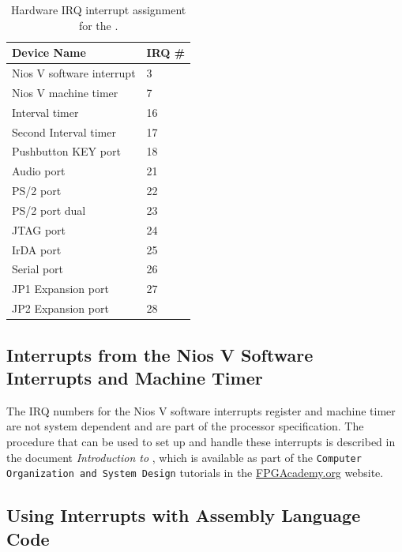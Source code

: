 \begin{table}[h]
    \begin{center}
    \begin{tabular}{l|l}
            \textbf{Device Name} &
            \textbf{IRQ \#}
        \\\hline
            Nios V software interrupt & 3 \\
            Nios V machine timer & 7 \\
            Interval timer & 16 \\
            Second Interval timer & 17 \\
            Pushbutton KEY port & 18 \\
            Audio port & 21 \\
            PS/2 port & 22 \\
            PS/2 port dual & 23 \\
            JTAG port & 24 \\
			IrDA port & 25 \\
            Serial port & 26 \\
            JP1 Expansion port & 27 \\
            JP2 Expansion port & 28 \\
    \end{tabular}
    \caption{Hardware IRQ interrupt assignment for the {\it \systemNameFull}.}
	 \label{tab:irq}
    \end{center}
\end{table}
\newpage

\subsection{Interrupts from the Nios V Software Interrupts and Machine Timer}
The IRQ numbers for the Nios V software interrupts register and machine timer are not
system dependent and are part of the processor specification. The procedure that can be used
to set up and handle these interrupts is described in the 
document {\it Introduction to \processor}, which is available as part of the 
\texttt{Computer Organization and System Design} tutorials in the 
{\small \href{https://www.fpgacademy.org/tutorials.html} {FPGAcademy.org}} website.






\subsection{Using Interrupts with Assembly Language Code}

